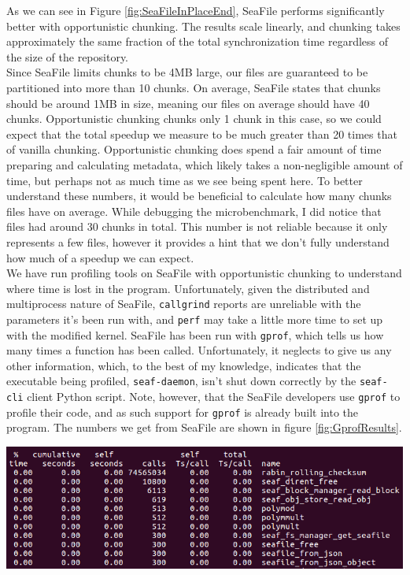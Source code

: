 \documentclass[table]{article}
\newenvironment{Figure}
  {\par\medskip\noindent\minipage{\linewidth}}
  {\endminipage\par\medskip}
\newcommand{\code}[1]{\texttt{#1}}
\begin{document}
\begin{multicols}{2}
As we can see in Figure \ref{fig:SeaFileInPlaceEnd}, SeaFile performs significantly better with opportunistic chunking. The results scale linearly, and chunking takes approximately the same fraction of the total synchronization time regardless of the size of the repository.\\

Since SeaFile limits chunks to be 4MB large, our files are guaranteed to be partitioned into more than 10 chunks. On average, SeaFile states that chunks should be around 1MB in size\cite{SeaFile-data-model}, meaning our files on average should have 40 chunks. Opportunistic chunking chunks only 1 chunk in this case, so we could expect that the total speedup we measure to be much greater than 20 times that of vanilla chunking. Opportunistic chunking does spend a fair amount of time preparing and calculating metadata, which likely takes a non-negligible amount of time, but perhaps not as much time as we see being spent here. To better understand these numbers, it would be beneficial to calculate how many chunks files have on average. While debugging the microbenchmark, I did notice that files had around 30 chunks in total. This number is not reliable because it only represents a few files, however it provides a hint that we don't fully understand how much of a speedup we can expect.\\

We have run profiling tools on SeaFile with opportunistic chunking to understand where time is lost in the program. Unfortunately, given the distributed and multiprocess nature of SeaFile, \code{callgrind} reports are unreliable with the parameters it's been run with, and \code{perf} may take a little more time to set up with the modified kernel. SeaFile has been run with \code{gprof}, which tells us how many times a function has been called. Unfortunately, it neglects to give us any other information, which, to the best of my knowledge, indicates that the executable being profiled, \code{seaf-daemon}, isn't shut down correctly by the \code{seaf-cli} client Python script. Note, however, that the SeaFile developers use \code{gprof} to profile their code, and as such support for \code{gprof} is already built into the program. The numbers we get from SeaFile are shown in figure \ref{fig:GprofResults}.

\begin{Figure}
 \centering
 \includegraphics[width=\linewidth]{results_gprof.png}
 \label{fig:GprofResults}
\end{Figure}


\end{multicols}
\end{document}
